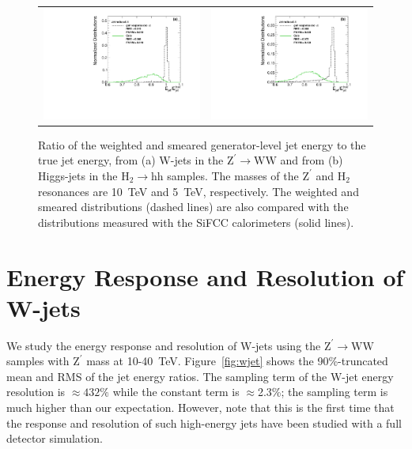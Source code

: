 \documentclass{PoS}
\begin{document}
\begin{figure}
\begin{center}
\begin{tabular}{cc}
\includegraphics[width=.4\textwidth]{figs/ZprimeWW_radius0p4_h_jeratio_gen_response.pdf} &
\includegraphics[width=.4\textwidth]{figs/2HDM_radius0p4_h_jeratio_gen_response.pdf} \\
\end{tabular}
\end{center}
\caption{Ratio of the weighted and smeared generator-level jet energy to 
 the true jet energy, from (a) W-jets in the 
$\mathrm{Z}^{\prime}\rightarrow \mathrm{WW}$ and from (b) Higgs-jets in 
the $\mathrm{H}_2\rightarrow \mathrm{hh}$ samples. The masses 
of the $\mathrm{Z}^{\prime}$ and $\mathrm{H}_2$ resonances 
are 10~TeV and 5~TeV, respectively. The weighted and smeared distributions 
(dashed lines) are also compared with the distributions measured 
with the SiFCC calorimeters (solid lines).}
\label{fig:weight}
\end{figure}


\section{Energy Response and Resolution of W-jets \label{sec:jetresponse}}
We study the energy response and resolution of W-jets using the 
$\mathrm{Z}^{\prime}\rightarrow \mathrm{WW}$ samples with $\mathrm{Z}^{\prime}$ 
mass at 10-40~TeV. Figure~\ref{fig:wjet} shows the 90\%-truncated mean 
and RMS of the jet energy ratios. The sampling term of the W-jet energy 
resolution is $\approx 432\%$ while the constant term is $\approx$2.3\%;
the sampling term is much higher than our expectation. However, note that 
this is the first time that the response and resolution of 
such high-energy jets have been studied with a full detector simulation. 
\end{document}
